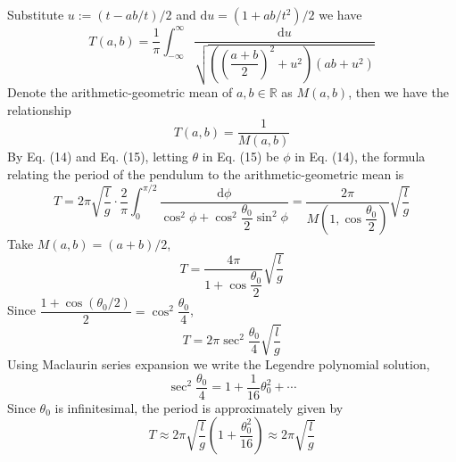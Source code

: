 \documentclass[12pt]{report}
\begin{document}
Substitute $u:=(t-ab/t)/2$ and $\mathrm{d}u=(1+ab/t^2)/2$ we have
\begin{equation}
    T(a,b)=\dfrac{1}{\pi}\int_{-\infty}^{\infty}\dfrac{\mathrm{d}u}{\sqrt{((\dfrac{a+b}{2})^2+u^2)(ab+u^2)}}
\end{equation}
Denote the arithmetic-geometric mean of $a,b\in\mathbb{R}$ as $M(a,b)$, then we have the relationship
\begin{equation}
    T(a,b)=\dfrac{1}{M(a,b)}
\end{equation}
By Eq. (14) and Eq. (15), letting $\theta$ in Eq. (15) be $\phi$ in Eq. (14), the formula relating the period of the pendulum to the arithmetic-geometric mean is
\begin{equation}
    T=2\pi\sqrt{\dfrac{l}{g}}\cdot\dfrac{2}{\pi}\int_{0}^{\pi/2}\dfrac{\mathrm{d}\phi}{\cos^2{\phi}+\cos^2\dfrac{\theta_0}{2}\sin^2{\phi}}=\dfrac{2\pi}{M(1,\cos{\dfrac{\theta_0}{2}})}\sqrt{\dfrac{l}{g}}
\end{equation}
Take $M(a,b)=(a+b)/2$,
\begin{equation}
    T=\dfrac{4\pi}{1+\cos{\dfrac{\theta_0}{2}}}\sqrt{\dfrac{l}{g}}
\end{equation}
Since $\dfrac{1+\cos(\theta_0/2)}{2}=\cos^2{\dfrac{\theta_0}{4}}$,
\begin{equation}
    T=2\pi\sec^2{\dfrac{\theta_0}{4}}\sqrt{\dfrac{l}{g}}
\end{equation}
Using Maclaurin series expansion we write the Legendre polynomial solution,
\begin{equation}
    \sec^2{\dfrac{\theta_0}{4}}=1+\dfrac{1}{16}\theta_0^2+\cdots
\end{equation}
Since $\theta_0$ is infinitesimal, the period is approximately given by
\begin{equation}
    T\approx 2\pi\sqrt{\dfrac{l}{g}}(1+\dfrac{\theta_0^2}{16})\approx 2\pi\sqrt{\dfrac{l}{g}}
\end{equation}
\end{document}
